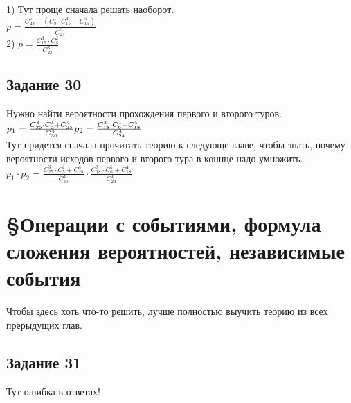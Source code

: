 \documentclass[12pt]{article}
\begin{document}
1)
Тут проще сначала решать наоборот.\\
$
p=\frac{C_{23}^5-(C_{8}^1\cdot C_{15}^4+C_{15}^5)}{C_{23}^5}
$\\
2)
$
p=\frac{C_{15}^3 \cdot C_{8}^2}{C_{23}^3}
$

\newpage
\subsection{Задание 30}
Нужно найти вероятности прохождения первого и второго туров.\\
$
p_1=\frac{C_{25}^3\cdot C_{5}^1+C_{25}^4}{C_{30}^4}\\
p_2=\frac{C_{18}^3\cdot C_{6}^1+C_{18}^4}{C_{24}^4}
$\\
Тут придется сначала прочитать теорию к следующе главе, чтобы знать, почему вероятности исходов первого и второго тура в коннце надо умножить.\\
$
p_1\cdot p_2=\frac{C_{25}^3\cdot C_{5}^1+C_{25}^4}{C_{30}^4}\cdot \frac{C_{18}^3\cdot C_{6}^1+C_{18}^4}{C_{24}^4}
$

\newpage
\section{\S Операции с событиями, формула сложения вероятностей, независимые события}

Чтобы здесь хоть что-то решить, лучше полностью выучить теорию из всех прерыдущих глав.

\newpage
\subsection{Задание 31}

Тут ошибка в ответах!
\end{document}
